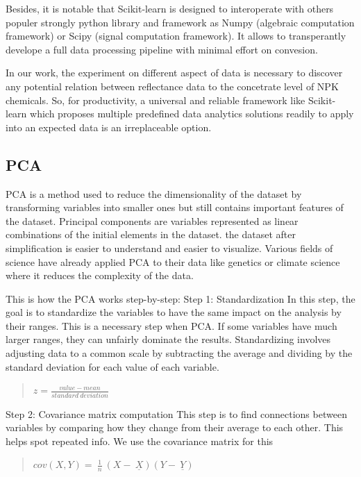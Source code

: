 Besides, it is notable that Scikit-learn is designed to interoperate
with others populer strongly python library and framework
as Numpy (algebraic computation framework) or Scipy (signal computation framework).
It allows to transperantly develope a full data processing pipeline
with minimal effort on convesion.

In our work, the experiment on different aspect of data is necessary
to discover any potential relation between reflectance data to the concetrate level of NPK chemicals.
So, for productivity, a universal and reliable framework like Scikit-learn
which proposes multiple predefined data analytics solutions readily to apply into an expected data
is an irreplaceable option.


\subsection{PCA}
PCA is a method used to reduce the dimensionality of the dataset by transforming variables into smaller ones but still contains important features of the dataset. 
Principal components are variables represented as linear combinations of the initial elements in the dataset.
the dataset after simplification is easier to understand and easier to visualize. Various fields of science have already applied PCA to their data like genetics or climate science where it reduces the complexity of the data.

This is how the PCA works step-by-step:
Step 1: Standardization
In this step, the goal is to standardize the variables to have the same impact on the analysis by their ranges. This is a necessary step when PCA. If some variables have much larger ranges, they can unfairly dominate the results. Standardizing involves adjusting data to a common scale by subtracting the average and dividing by the standard deviation for each value of each variable. 
\begin{quote}

\(z = \frac{value - mean}{standard\ deviation}\)
\end{quote}

Step 2: Covariance matrix computation
This step is to find connections between variables by comparing how they change from their average to each other. This helps spot repeated info. We use the covariance matrix for this

\begin{quote}

\(cov(X,Y) = \ \frac{1}{n}\ \left( X - \ \underline{X} \right)\left( Y - \ \underline{Y} \right)\)
\end{quote}

